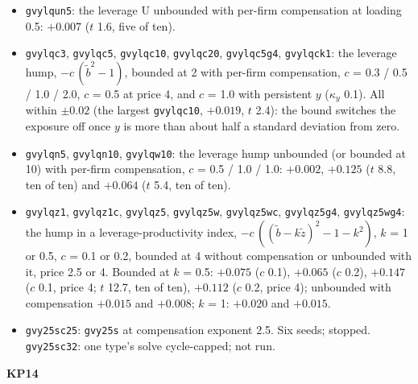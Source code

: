 \documentclass[11pt]{article}
\begin{document}
\begin{itemize}
\item \texttt{gvylqun5}: the leverage U unbounded with per-firm compensation at loading 0.5: $+0.007$ ($t$ 1.6, five of ten).
\item \texttt{gvylqc3}, \texttt{gvylqc5}, \texttt{gvylqc10}, \texttt{gvylqc20}, \texttt{gvylqc5g4}, \texttt{gvylqck1}: the leverage hump, $-c\,(\tilde b^2 - 1)$, bounded at 2 with per-firm compensation, $c$ = 0.3 / 0.5 / 1.0 / 2.0, $c$ = 0.5 at price 4, and $c$ = 1.0 with persistent $y$ ($\kappa_y$ 0.1). All within $\pm0.02$ (the largest \texttt{gvylqc10}, $+0.019$, $t$ 2.4): the bound switches the exposure off once $y$ is more than about half a standard deviation from zero.
\item \texttt{gvylqn5}, \texttt{gvylqn10}, \texttt{gvylqw10}: the leverage hump unbounded (or bounded at 10) with per-firm compensation, $c$ = 0.5 / 1.0 / 1.0: $+0.002$, $+0.125$ ($t$ 8.8, ten of ten) and $+0.064$ ($t$ 5.4, ten of ten).
\item \texttt{gvylqz1}, \texttt{gvylqz1c}, \texttt{gvylqz5}, \texttt{gvylqz5w}, \texttt{gvylqz5wc}, \texttt{gvylqz5g4}, \texttt{gvylqz5wg4}: the hump in a leverage-productivity index, $-c\,((\tilde b - k\tilde z)^2 - 1 - k^2)$, $k$ = 1 or 0.5, $c$ = 0.1 or 0.2, bounded at 4 without compensation or unbounded with it, price 2.5 or 4. Bounded at $k$ = 0.5: $+0.075$ ($c$ 0.1), $+0.065$ ($c$ 0.2), $+0.147$ ($c$ 0.1, price 4; $t$ 12.7, ten of ten), $+0.112$ ($c$ 0.2, price 4); unbounded with compensation $+0.015$ and $+0.008$; $k$ = 1: $+0.020$ and $+0.015$.
\item \texttt{gvy25sc25}: \texttt{gvy25s} at compensation exponent 2.5. Six seeds; stopped. \texttt{gvy25sc32}: one type's solve cycle-capped; not run.
\end{itemize}
\noindent\textbf{KP14}
\end{document}
